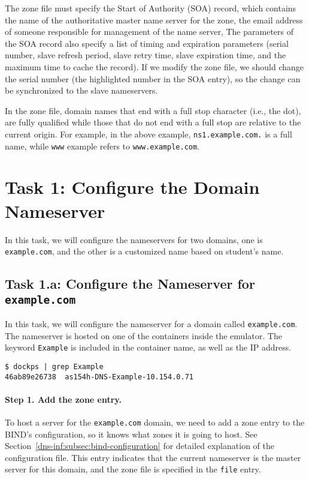 The zone file must specify the Start of Authority (SOA) record, which
contains the name of the authoritative master name server for the zone, 
the email address of someone responsible for management of the name server,
The parameters of the SOA record also specify a list of timing
and expiration parameters (serial number, slave refresh period, slave retry time, slave
expiration time, and the maximum time to cache the record). 
If we modify the zone file, we should change the serial number (the highlighted 
number in the SOA entry), so the change can be synchronized to the 
slave nameservers. 

In the zone file, domain names that end with a full stop character (i.e., the dot),
are fully qualified while those that do not end with a full stop are
relative to the current origin. 
For example, in the above example, \texttt{ns1.example.com.} is a full name,
while \texttt{www} example refers to \texttt{www.example.com}.



\section{Task 1: Configure the Domain Nameserver}

In this task, we will configure the nameservers 
for two domains, one is \texttt{example.com}, 
and the other is a customized name based on 
student's name. 

\subsection{Task 1.a: Configure the Nameserver for \texttt{example.com}} 

In this task, we will configure the nameserver for a domain
called \texttt{example.com}. The nameserver is hosted on 
one of the containers inside the emulator. The keyword \texttt{Example} is 
included in the container name, as well
as the IP address. 

\begin{lstlisting}
$ dockps | grep Example
46ab89e26738  as154h-DNS-Example-10.154.0.71
\end{lstlisting}


\paragraph{Step 1. Add the zone entry.} 
To host a server for the \texttt{example.com} domain, we need to
add a zone entry to the BIND's configuration, 
so it knows what zones it is going to host. 
See Section~\ref{dns-inf:subsec:bind-configuration} 
for detailed explanation of the configuration file. 
This entry indicates that the current nameserver
is the master server for this domain, and the zone file is
specified in the \texttt{file} entry.


